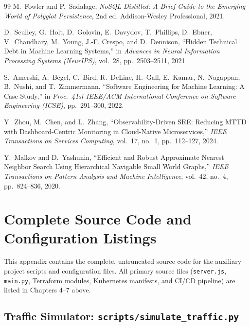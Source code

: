 \documentclass[12pt,a4paper]{report}
\begin{document}
\begin{thebibliography}{99}
  M.~Fowler and P.~Sadalage,
  \textit{NoSQL Distilled: A Brief Guide to the Emerging World of
  Polyglot Persistence}, 2nd ed.
  Addison-Wesley Professional, 2021.

  D.~Sculley, G.~Holt, D.~Golovin, E.~Davydov, T.~Phillips, D.~Ebner,
  V.~Chaudhary, M.~Young, J.-F. Crespo, and D.~Dennison,
  ``Hidden Technical Debt in Machine Learning Systems,''
  in \textit{Advances in Neural Information Processing Systems (NeurIPS)},
  vol.~28, pp.~2503--2511, 2021.

  S.~Amershi, A.~Begel, C.~Bird, R.~DeLine, H.~Gall, E.~Kamar,
  N.~Nagappan, B.~Nushi, and T.~Zimmermann,
  ``Software Engineering for Machine Learning: A Case Study,''
  in \textit{Proc.\ 41st IEEE/ACM International Conference on Software
  Engineering (ICSE)}, pp.~291--300, 2022.

  Y.~Zhou, M.~Chen, and L.~Zhang,
  ``Observability-Driven SRE: Reducing MTTD with Dashboard-Centric
  Monitoring in Cloud-Native Microservices,''
  \textit{IEEE Transactions on Services Computing}, vol.~17, no.~1,
  pp.~112--127, 2024.

  Y.~Malkov and D.~Yashunin,
  ``Efficient and Robust Approximate Nearest Neighbor Search Using
  Hierarchical Navigable Small World Graphs,''
  \textit{IEEE Transactions on Pattern Analysis and Machine Intelligence},
  vol.~42, no.~4, pp.~824--836, 2020.

\end{thebibliography}
\newpage


\appendix
\chapter{Complete Source Code and Configuration Listings}

This appendix contains the complete, untruncated source code for the auxiliary
project scripts and configuration files. All primary source files
(\texttt{server.js}, \texttt{main.py}, Terraform modules, Kubernetes manifests,
and CI/CD pipeline) are listed in Chapters 4--7 above.

\section{Traffic Simulator: \texttt{scripts/simulate\_traffic.py}}
\end{document}
